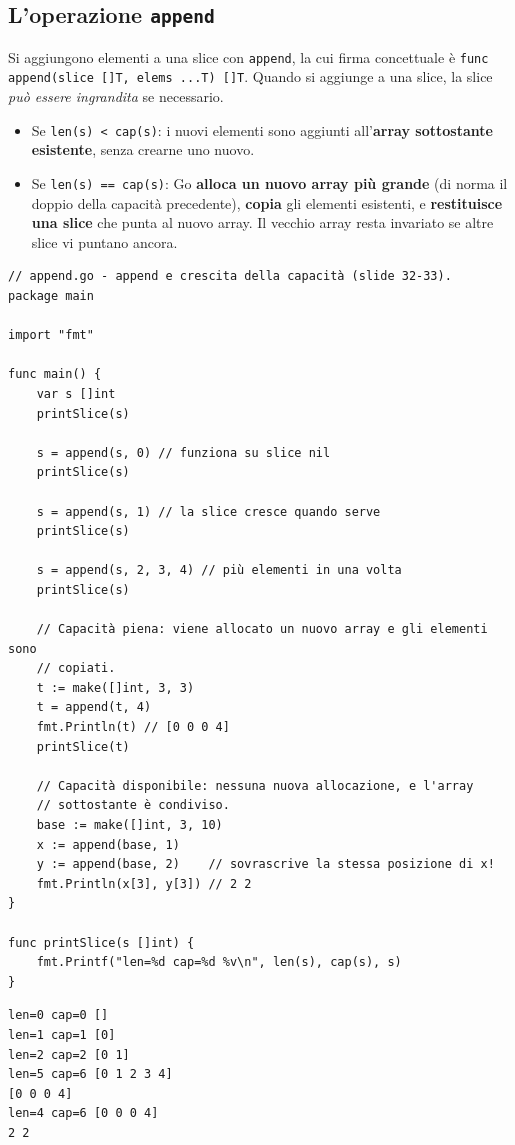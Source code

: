 \documentclass[11pt,a4paper]{report}
\newcommand{\cod}[1]{\texttt{#1}}
\begin{document}
\subsection{L'operazione \texttt{append}}

Si aggiungono elementi a una slice con \cod{append}, la cui firma concettuale è
\cod{func append(slice []T, elems ...T) []T}. Quando si aggiunge a una slice, la
slice \emph{può essere ingrandita} se necessario.

\begin{itemize}
  \item Se \cod{len(s) < cap(s)}: i nuovi elementi sono aggiunti
        all'\textbf{array sottostante esistente}, senza crearne uno nuovo.
  \item Se \cod{len(s) == cap(s)}: Go \textbf{alloca un nuovo array più grande}
        (di norma il doppio della capacità precedente), \textbf{copia} gli
        elementi esistenti, e \textbf{restituisce una slice} che punta al nuovo
        array. Il vecchio array resta invariato se altre slice vi puntano ancora.
\end{itemize}

\begin{lstlisting}[style=gocode,caption={\texttt{04\_data\_structures/append.go}}]
// append.go - append e crescita della capacità (slide 32-33).
package main

import "fmt"

func main() {
	var s []int
	printSlice(s)

	s = append(s, 0) // funziona su slice nil
	printSlice(s)

	s = append(s, 1) // la slice cresce quando serve
	printSlice(s)

	s = append(s, 2, 3, 4) // più elementi in una volta
	printSlice(s)

	// Capacità piena: viene allocato un nuovo array e gli elementi sono
	// copiati.
	t := make([]int, 3, 3)
	t = append(t, 4)
	fmt.Println(t) // [0 0 0 4]
	printSlice(t)

	// Capacità disponibile: nessuna nuova allocazione, e l'array
	// sottostante è condiviso.
	base := make([]int, 3, 10)
	x := append(base, 1)
	y := append(base, 2)    // sovrascrive la stessa posizione di x!
	fmt.Println(x[3], y[3]) // 2 2
}

func printSlice(s []int) {
	fmt.Printf("len=%d cap=%d %v\n", len(s), cap(s), s)
}
\end{lstlisting}
\begin{lstlisting}[style=output]
len=0 cap=0 []
len=1 cap=1 [0]
len=2 cap=2 [0 1]
len=5 cap=6 [0 1 2 3 4]
[0 0 0 4]
len=4 cap=6 [0 0 0 4]
2 2
\end{lstlisting}
\end{document}

